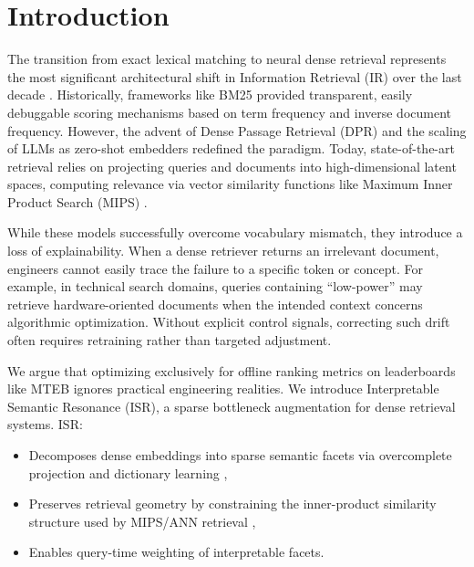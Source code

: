 \documentclass[sigconf,authordraft]{acmart}
\begin{document}


\maketitle

\section{Introduction}
The transition from exact lexical matching to neural dense retrieval represents the most significant architectural shift in Information Retrieval (IR) over the last decade \cite{lin2021}. Historically, frameworks like BM25 \cite{robertson2009} provided transparent, easily debuggable scoring mechanisms based on term frequency and inverse document frequency. However, the advent of Dense Passage Retrieval (DPR) \cite{karpukhin2020} and the scaling of LLMs \cite{bendersky2023} as zero-shot embedders redefined the paradigm. Today, state-of-the-art retrieval relies on projecting queries and documents into high-dimensional latent spaces, computing relevance via vector similarity functions like Maximum Inner Product Search (MIPS) \cite{shrivastava2014}.

While these models successfully overcome vocabulary mismatch, they introduce a loss of explainability. When a dense retriever returns an irrelevant document, engineers cannot easily trace the failure to a specific token or concept. For example, in technical search domains, queries containing “low-power” may retrieve hardware-oriented documents when the intended context concerns algorithmic optimization. Without explicit control signals, correcting such drift often requires retraining rather than targeted adjustment.

We argue that optimizing exclusively for offline ranking metrics on leaderboards like MTEB \cite{muennighoff2023} ignores practical engineering realities. We introduce Interpretable Semantic Resonance (ISR), a sparse bottleneck augmentation for dense retrieval systems. ISR:

\begin{itemize}
    \item Decomposes dense embeddings into sparse semantic facets via overcomplete projection and dictionary learning \cite{bricken2023,cunningham2024},
    \item Preserves retrieval geometry by constraining the inner-product similarity structure used by MIPS/ANN retrieval \cite{shrivastava2014,johnson2019},
    \item Enables query-time weighting of interpretable facets.
\end{itemize}
\end{document}
